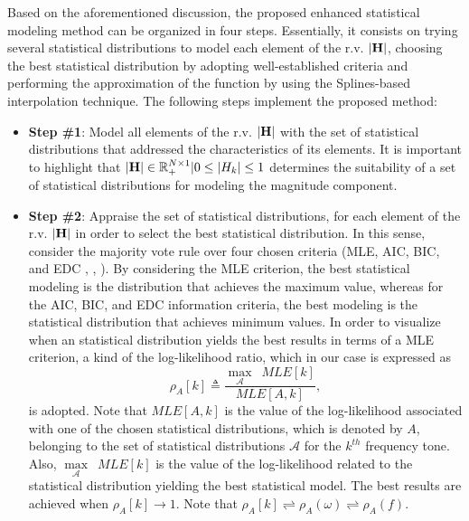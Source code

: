 \documentclass[journal]{IEEEtran}
\begin{document}
Based on the aforementioned discussion, the proposed enhanced statistical modeling method can be organized in four steps. Essentially, it consists on trying several statistical distributions to model each element of the \ac{r.v.} $\bf |H|$, choosing the best statistical distribution by adopting well-established criteria and performing the approximation of the function by using the Splines-based interpolation technique. The following steps implement the proposed method:
\begin{itemize}
	\item \textbf{Step \#1}: Model all elements of the \ac{r.v.} $\bf |H|$ with the set of statistical distributions that addressed the characteristics of its elements. It is important to highlight that ${\bf |H|} \in \mathbb{R}_{+}^{N\times 1}|0 \leq {|H_k|} \leq 1$ determines the suitability of a set of statistical distributions for modeling the magnitude component.
	\item \textbf{Step \#2}: Appraise the set of statistical distributions, for each element of the \ac{r.v.} $\bf |H|$ in order to select the best statistical distribution. In this sense, consider the majority vote rule \cite{vote} over four chosen criteria (\ac{MLE}, \ac{AIC}, \ac{BIC}, and \ac{EDC} \cite{Dorea:Sim}, \cite{Cabral:Multi}, \cite{Andrei:Meas}). By considering the \ac{MLE} criterion, the best statistical modeling is the distribution that achieves the maximum value, whereas for the \ac{AIC}, \ac{BIC}, and \ac{EDC} information criteria, the best modeling is the statistical distribution that achieves minimum values. 
	In order to visualize when an statistical distribution yields the best results in terms of a \ac{MLE} criterion, a kind of the log-likelihood ratio, which in our case is expressed as
    \begin{equation}
    \rho_{A} [k] \triangleq \dfrac{\underset{\mathcal{A}}{\max} \,\, \, MLE[k]}{MLE[A,k]},
    \label{eq:log-lik}
    \end{equation}
    is adopted. Note that $ MLE[A,k]$ is the value of the log-likelihood associated with one of the chosen statistical distributions, which is denoted by $A$, belonging to the set of statistical distributions $\mathcal{A}$ for the $k^{th}$ frequency tone. Also, $\underset{\mathcal{A}}{\max} \,\, \, MLE[k]$ is the value of the log-likelihood related to the statistical distribution yielding the best statistical model. The best results are achieved when $\rho_A [k] \rightarrow 1$. Note that $\rho_A [k] \rightleftharpoons \rho_A (\omega) \rightleftharpoons \rho_A (f)$.

\end{itemize}
\end{document}

